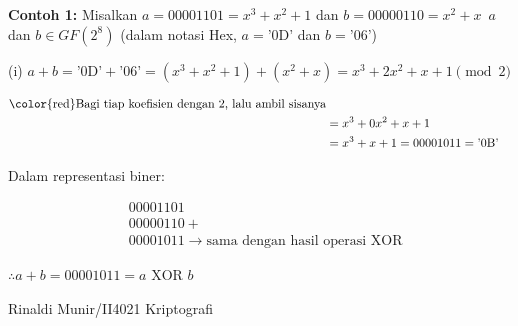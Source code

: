 \documentclass{article}
\begin{document}

\textbf{Contoh 1:} Misalkan $a = 00001101 = x^3 + x^2 + 1$ dan $b = 00000110 = x^2 + x$\
$a$ dan $b \in GF(2^8)$ \quad (dalam notasi Hex, $a = \text{'0D'}$ dan $b = \text{'06'}$)\

(i) $a + b = \text{'0D'} + \text{'06'} = (x^3 + x^2 + 1) + (x^2 + x) = x^3 + 2x^2 + x + 1 \pmod{2}$

\begin{align*}
\text{\color{red}Bagi tiap koefisien dengan 2, lalu ambil sisanya} \\
&= x^3 + 0x^2 + x + 1 \\
&= x^3 + x + 1 = 00001011 = \text{'0B'}
\end{align*}

Dalam representasi biner:

\begin{align*}
&00001101 \\
&00000110 + \\
&00001011 \rightarrow \text{sama dengan hasil operasi XOR}
\end{align*}

$\therefore a + b = 00001011 = a \text{ XOR } b$

\vspace{10mm}

\centering Rinaldi Munir/II4021 Kriptografi
\end{document}
